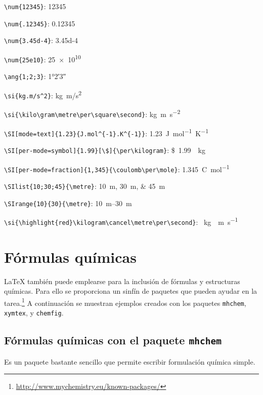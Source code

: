 \documentclass[11pt,a4paper]{article}
\begin{document}
\bigskip
\begin{compactitem}
	\item \verb|\num{12345}|: \num{12345}
	\item \verb|\num{.12345}|: \num{.12345}
	\item \verb|\num{3.45d-4}|: \num{3.45d-4}
	\item \verb|\num{25e10}|: \num{25e10}
	\item \verb|\ang{1;2;3}|: \ang{1;2;3}
	\item \verb|\si{kg.m/s^2}|: \si{kg.m/s^2}
	\item \verb|\si{\kilo\gram\metre\per\square\second}|: \si{\kilo\gram\metre\per\square\second}
	\item \verb|\SI[mode=text]{1.23}{J.mol^{-1}.K^{-1}}|: \SI[mode=text]{1.23}{J.mol^{-1}.K^{-1}}
	\item \verb|\SI[per-mode=symbol]{1.99}[\$]{\per\kilogram}|: \SI[per-mode=symbol]{1.99}[\$]{\per\kilogram}
	\item \verb|\SI[per-mode=fraction]{1,345}{\coulomb\per\mole}|: \SI[per-mode=fraction]{1,345}{\coulomb\per\mole}
	\item \verb|\SIlist{10;30;45}{\metre}|: \SIlist{10;30;45}{\metre}
	\item \verb|\SIrange{10}{30}{\metre}|: \SIrange{10}{30}{\metre}
	\item \verb|\si{\highlight{red}\kilogram\cancel\metre\per\second}|: \si{\kilogram\cancel\metre\per\second}
\end{compactitem}


\section{Fórmulas químicas}
\LaTeX{} también puede emplearse para la inclusión de fórmulas y estructuras químicas. Para ello se proporciona un sinfín de paquetes que pueden ayudar en la tarea.\footnote{\url{http://www.mychemistry.eu/known-packages/}} A continuación se muestran ejemplos creados con los paquetes \texttt{mhchem}, \texttt{xymtex}, y \texttt{chemfig}.



\subsection{Fórmulas químicas con el paquete \texttt{mhchem}}
Es un paquete bastante sencillo que permite escribir formulación química simple.

\begin{center}
\end{center}
\end{document}
